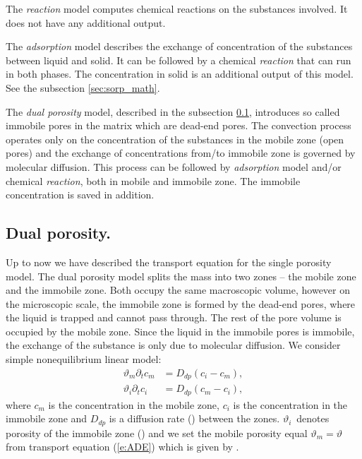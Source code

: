The \emph{reaction} model computes chemical reactions on the substances involved. It does not have any additional output.

The \emph{adsorption} model describes the exchange of concentration of the substances between liquid and solid. It can be
followed by a chemical \emph{reaction} that can run in both phases. The concentration in solid is an additional output 
of this model. See the subsection \ref{sec:sorp_math}.


The \emph{dual porosity} model, described in the subsection \ref{sec:dual_porosity}, introduces so called immobile pores in the matrix
which are dead-end pores. The convection process operates only on the concentration of the substances in the mobile zone (open pores) 
and the exchange of concentrations from/to immobile zone is governed by molecular diffusion. This process can be followed by 
\emph{adsorption} model and/or chemical \emph{reaction}, both in mobile and immobile zone. The immobile concentration is saved
in addition.


\subsection{Dual porosity.}
\label{sec:dual_porosity}

Up to now we have described the transport equation for the single porosity model. The dual porosity model splits the mass into 
two zones -- the mobile zone and the immobile zone. Both occupy the same macroscopic volume, however on the microscopic scale, 
the immobile zone is formed by the dead-end pores, where the liquid is trapped and cannot pass through. The rest of the pore volume 
is occupied by the mobile zone. Since the liquid in the immobile pores is immobile, the exchange of the substance is only due 
to molecular diffusion. We consider simple nonequilibrium linear model:
\begin{align}
    \vartheta_m \partial_t c_m &= D_{dp} ( c_i - c_m), \label{eqn:dual_porosity_ode1}\\
    \vartheta_i \partial_t c_i &= D_{dp} ( c_m - c_i), \label{eqn:dual_porosity_ode2}
\end{align}
where $c_m$ is the concentration in the mobile zone, $c_i$ is the concentration in the immobile zone and
$D_{dp}$ is a diffusion rate () between the zones.
$\vartheta_i$~denotes porosity of the immobile zone () and 
we set the mobile porosity equal $\vartheta_m = \vartheta$ from transport equation (\ref{e:ADE}) which is given by
.

